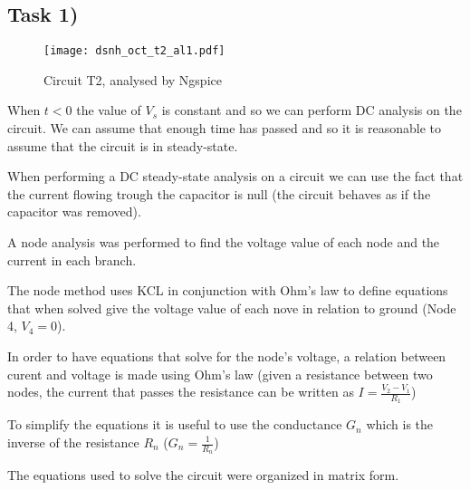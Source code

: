 \subsection{Task 1)}
\label{subsec:task1_a}

\begin{figure}[ht]
	\centering
	\texttt{[image: dsnh\_oct\_t2\_al1.pdf]}
	\caption{Circuit T2, analysed by Ngspice}
\label{fig:Dsnh_sim_t2}
\end{figure}

When $t<0$ the value of $V_s$ is constant and so we can perform DC analysis on the circuit. We can assume that enough time has passed and so it is reasonable to assume that the circuit is in steady-state.

When performing a DC steady-state analysis on a circuit we can use the fact that the current flowing trough the capacitor is null (the circuit behaves as if the capacitor was removed).

A node analysis was performed to find the voltage value of each node and the current in each branch.

The node method uses KCL in conjunction with Ohm’s law to define equations that when solved give the voltage value 
of each nove in relation to ground (Node 4, $V_4 = 0$). 

In order to have equations that solve for the node’s voltage, a relation between curent and voltage is made using 
Ohm’s law (given a resistance between two nodes, the current that passes the resistance can be written as 
$I=\frac{V_2-V_1}{R_1}$)

To simplify the equations it is useful to use the conductance $G_n$ which is the inverse of the resistance $R_n$ 
($G_n=\frac{1}{R_n}$)

The equations used to solve the circuit were organized in matrix form.

